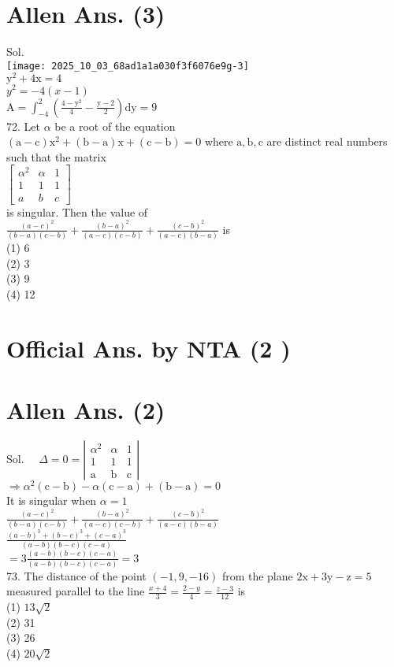 \documentclass[10pt]{article}
\begin{document}
\section*{Allen Ans. (3)}
Sol.\\
\texttt{[image: 2025\_10\_03\_68ad1a1a030f3f6076e9g-3]}\\
\(\mathrm{y}^{2}+4 \mathrm{x}=4\)\\
\(y^{2}=-4(x-1)\)\\
\(\mathrm{A}=\int_{-4}^{2}\left(\frac{4-\mathrm{y}^{2}}{4}-\frac{\mathrm{y}-2}{2}\right) \mathrm{dy}=9\)\\
72. Let \(\alpha\) be a root of the equation\\
\((\mathrm{a}-\mathrm{c}) \mathrm{x}^{2}+(\mathrm{b}-\mathrm{a}) \mathrm{x}+(\mathrm{c}-\mathrm{b})=0\) where \(\mathrm{a}, \mathrm{b}, \mathrm{c}\) are distinct real numbers such that the matrix\\
\(\left[\begin{array}{ccc}\alpha^{2} & \alpha & 1 \\ 1 & 1 & 1 \\ a & b & c\end{array}\right]\)\\
is singular. Then the value of\\
\(\frac{(a-c)^{2}}{(b-a)(c-b)}+\frac{(b-a)^{2}}{(a-c)(c-b)}+\frac{(c-b)^{2}}{(a-c)(b-a)}\) is\\
(1) 6\\
(2) 3\\
(3) 9\\
(4) 12

\section*{Official Ans. by NTA (2 )}
\section*{Allen Ans. (2)}
Sol. \(\quad \Delta=0=\left|\begin{array}{ccc}\alpha^{2} & \alpha & 1 \\ 1 & 1 & 1 \\ \mathrm{a} & \mathrm{b} & \mathrm{c}\end{array}\right|\)\\
\(\Rightarrow \alpha^{2}(\mathrm{c}-\mathrm{b})-\alpha(\mathrm{c}-\mathrm{a})+(\mathrm{b}-\mathrm{a})=0\)\\
It is singular when \(\alpha=1\)\\
\(\frac{(a-c)^{2}}{(b-a)(c-b)}+\frac{(b-a)^{2}}{(a-c)(c-b)}+\frac{(c-b)^{2}}{(a-c)(b-a)}\)\\
\(\frac{(a-b)^{3}+(b-c)^{3}+(c-a)^{3}}{(a-b)(b-c)(c-a)}\)\\
\(=3 \frac{(a-b)(b-c)(c-a)}{(a-b)(b-c)(c-a)}=3\)\\
73. The distance of the point \((-1,9,-16)\) from the plane \(2 \mathrm{x}+3 \mathrm{y}-\mathrm{z}=5\) measured parallel to the line \(\frac{x+4}{3}=\frac{2-y}{4}=\frac{z-3}{12}\) is\\
(1) \(13 \sqrt{2}\)\\
(2) 31\\
(3) 26\\
(4) \(20 \sqrt{2}\)
\end{document}
